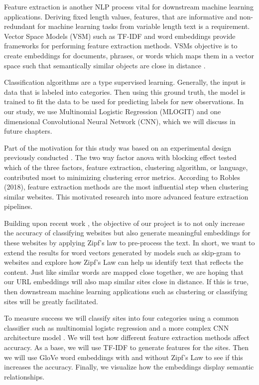 \documentclass[12pt]{article}
\begin{document}
Feature extraction is another NLP process vital for downstream machine learning applications. Deriving fixed length values, features, that are informative and non-redundant for machine learning tasks from variable length text is a requirement. Vector Space Models (VSM) such as TF-IDF and word embeddings provide frameworks for performing feature extraction methods. VSMs objective is to create embeddings for documents, phrases, or words which maps them in a vector space such that semantically similar objects are close in distance \cite{Turney:2010:FMV:1861751.1861756}.

Classification algorithms are a type supervised learning. Generally, the input is data that is labeled into categories. Then using this ground truth, the model is trained to fit the data to be used for predicting labels for new observations. In our study, we use Multinomial Logistic Regression (MLOGIT) and one dimensional Convolutional Neural Network (CNN), which we will discuss in future chapters. 

Part of the motivation for this study was based on an experimental design previously conducted \cite{previous}. The two way factor anova with blocking effect tested which of the three factors, feature extraction, clustering algorithm, or language, contributed most to minimizing clustering error metrics. According to Robles (2018), feature extraction methods are the most influential step when clustering similar websites. This motivated research into more advanced feature extraction pipelines.

Building upon recent work \cite{previous2}, the objective of our project is to not only increase the accuracy of classifying websites but also generate meaningful embeddings for these websites by applying Zipf's law to pre-process the text. In short, we want to extend the results for word vectors generated by models such as skip-gram to websites and explore how Zipf's Law can help us identify text that reflects the content. Just like similar words are mapped close together, we are hoping that our URL embeddings will also map similar sites close in distance. If this is true, then downstream machine learning applications such as clustering or classifying sites will be greatly facilitated. 

To measure success we will classify sites into four categories using a common classifier such as multinomial logistc regression and a more complex CNN architecture model . We will test how different feature extraction methods affect accuracy. As a base, we will use TF-IDF to generate features for the sites. Then we will use GloVe word embeddings with and without Zipf's Law to see if this increases the accuracy. Finally, we visualize how the embeddings display semantic relationships. 
\end{document}
